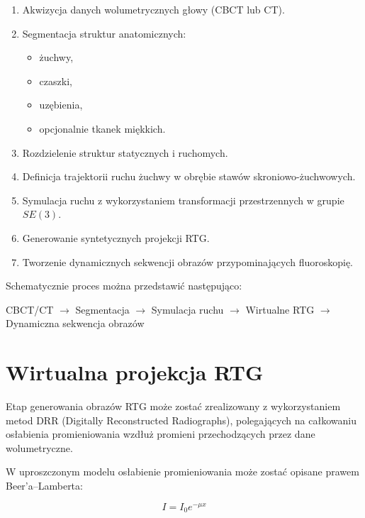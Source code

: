 \documentclass[11pt,a4paper]{article}
\begin{document}
\begin{enumerate}[label=\arabic*.]

\item Akwizycja danych wolumetrycznych głowy (CBCT lub CT).

\item Segmentacja struktur anatomicznych:
\begin{itemize}
\item żuchwy,
\item czaszki,
\item uzębienia,
\item opcjonalnie tkanek miękkich.
\end{itemize}

\item Rozdzielenie struktur statycznych i ruchomych.

\item Definicja trajektorii ruchu żuchwy w obrębie stawów skroniowo-żuchwowych.

\item Symulacja ruchu z wykorzystaniem transformacji przestrzennych w grupie $SE(3)$.

\item Generowanie syntetycznych projekcji RTG.

\item Tworzenie dynamicznych sekwencji obrazów przypominających fluoroskopię.

\end{enumerate}

Schematycznie proces można przedstawić następująco:

\begin{center}
CBCT/CT $\rightarrow$
Segmentacja $\rightarrow$
Symulacja ruchu $\rightarrow$
Wirtualne RTG $\rightarrow$
Dynamiczna sekwencja obrazów
\end{center}

\section{Wirtualna projekcja RTG}

Etap generowania obrazów RTG może zostać zrealizowany z wykorzystaniem metod DRR (Digitally Reconstructed Radiographs), polegających na całkowaniu osłabienia promieniowania wzdłuż promieni przechodzących przez dane wolumetryczne.

W uproszczonym modelu osłabienie promieniowania może zostać opisane prawem Beer'a–Lamberta:

\begin{equation}
I = I_0 e^{-\mu x}
\end{equation}
\end{document}
